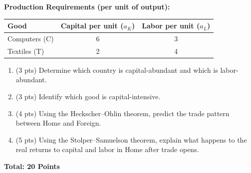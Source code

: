 \documentclass[12pt]{article}
\begin{document}
\vspace{0.3cm}

\noindent \textbf{Production Requirements (per unit of output):}

\begin{center}
\begin{tabular}{lcc}
\toprule
\textbf{Good} & \textbf{Capital per unit ($a_K$)} & \textbf{Labor per unit ($a_L$)} \\
\midrule
Computers (C) & 6 & 3 \\
Textiles (T) & 2 & 4 \\
\bottomrule
\end{tabular}
\end{center}

\vspace{0.5cm}


\begin{enumerate}
    \item[(a)] (3 pts) Determine which country is capital-abundant and which is labor-abundant.  
    \item[(b)] (3 pts) Identify which good is capital-intensive.  
    \item[(c)] (4 pts) Using the Heckscher--Ohlin theorem, predict the trade pattern between Home and Foreign.  
    \item[(d)] (5 pts) Using the Stolper--Samuelson theorem, explain what happens to the real returns to capital and labor in Home after trade opens.  
\end{enumerate}

\vfill
\noindent \textbf{Total: 20 Points}
\end{document}
